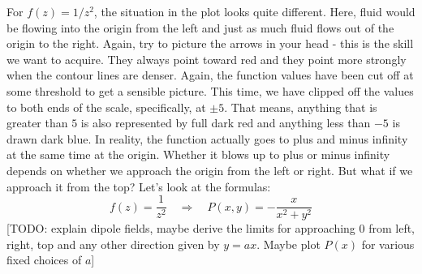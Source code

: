 \documentclass[12pt]{article}
\begin{document}
\medskip
For $f(z) = 1/z^2$, the situation in the plot looks quite different. Here, fluid would be flowing into the origin from the left and just as much fluid flows out of the origin to the right. Again, try to picture the arrows in your head - this is the skill we want to acquire. They always point toward red and they point more strongly when the contour lines are denser. Again, the function values have been cut off at some threshold to get a sensible picture. This time, we have clipped off the values to both ends of the scale, specifically, at $\pm 5$. That means, anything that is greater than $5$ is also represented by full dark red and anything less than $-5$ is drawn dark blue. In reality, the function actually goes to plus and minus infinity at the same time at the origin. Whether it blows up to plus or minus infinity depends on whether we approach the origin from the left or right. But what if we approach it from the top? Let's look at the formulas:
\begin{equation}
f(z)   =  \frac{1}{z^2} \quad \Rightarrow \quad
P(x,y) = -\frac{x}{x^2 + y^2}
\end{equation}
[TODO: explain dipole fields, maybe derive the limits for approaching $0$ from left, right, top and any other direction given by $y = a x$. Maybe plot $P(x)$ for various fixed choices of $a$]
\end{document}
